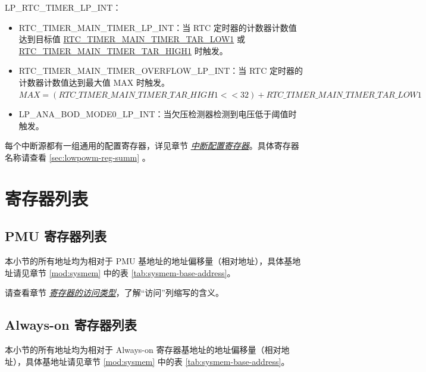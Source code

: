 \documentclass[main\_\_CN.tex]{subfiles}
\begin{document}
LP\_RTC\_TIMER\_LP\_INT：
\begin{itemize}
\item \label{int:RTCTIMERMAINTIMERLPINT}RTC\_TIMER\_MAIN\_TIMER\_LP\_INT：当 RTC 定时器的计数器计数值达到目标值 \hyperref[fielddesc:RTCTIMERMAINTIMERTARLOW1]{RTC\_TIMER\_MAIN\_TIMER\_TAR\_LOW1} 或 \hyperref[fielddesc:RTCTIMERMAINTIMERTARHIGH1]{RTC\_TIMER\_MAIN\_TIMER\_TAR\_HIGH1} 时触发。
\item \label{int:RTCTIMERMAINTIMEROVERFLOWLPINT}RTC\_TIMER\_MAIN\_TIMER\_OVERFLOW\_LP\_INT：当 RTC 定时器的计数器计数值达到最大值 MAX 时触发。\\
$MAX = (\hyperref[fielddesc:RTCTIMERMAINTIMERTARHIGH1]{RTC\_TIMER\_MAIN\_TIMER\_TAR\_HIGH1} << 32) + \hyperref[fielddesc:RTCTIMERMAINTIMERTARLOW1]{RTC\_TIMER\_MAIN\_TIMER\_TAR\_LOW1}$

\item \label{int:LPANABODMODE0LPINT}LP\_ANA\_BOD\_MODE0\_LP\_INT：当欠压检测器检测到电压低于阈值时触发。
\end{itemize}

每个中断源都有一组通用的配置寄存器，详见章节 \hyperref[interrupt-config-registers]{\textit{中断配置寄存器}}。具体寄存器名称请查看 \ref{sec:lowpowm-reg-summ} \textit{}。


\clearpage
\section{寄存器列表}\hypertarget{lowpowm-reg-summ}{}\label{sec:lowpowm-reg-summ}

\subsection{PMU 寄存器列表}

本小节的所有地址均为相对于 PMU 基地址的地址偏移量（相对地址），具体基地址请见章节 \ref{mod:sysmem} \textit{} 中的表 \ref{tab:sysmem-base-address}。

请查看章节 \hyperref[glossary-access-types]{\textit{寄存器的访问类型}}，了解“访问”列缩写的含义。



\subsection{Always-on 寄存器列表}

本小节的所有地址均为相对于 Always-on 寄存器基地址的地址偏移量（相对地址），具体基地址请见章节 \ref{mod:sysmem} \textit{} 中的表 \ref{tab:sysmem-base-address}。
\end{document}
